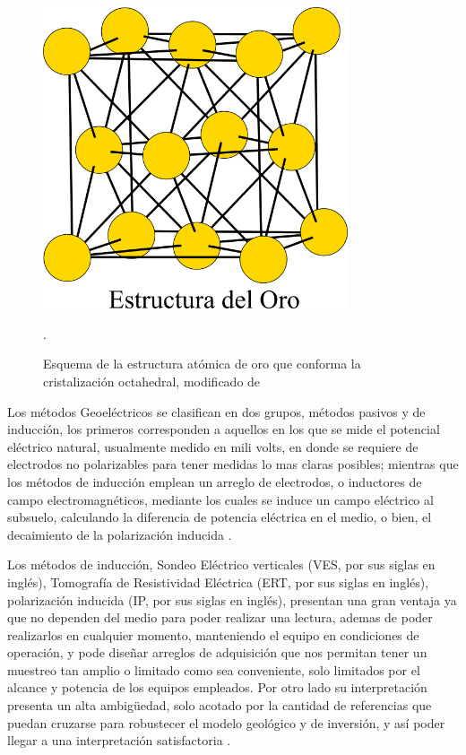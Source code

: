 			\begin{figure}[h!]
				\centering
				\includegraphics[width=9cm]{Imagenes/estructura-oro}
				\caption[Estructura atómica del oro]{Esquema de la estructura atómica de oro que conforma la cristalización octahedral, modificado de \citet{sorrell1973}}.
				\label{fig:eo}
			\end{figure}
			
			Los métodos Geoeléctricos se clasifican en dos grupos, métodos pasivos y de inducción, los primeros corresponden a aquellos en los que se mide el potencial eléctrico natural, usualmente medido en mili volts, en donde se requiere de electrodos no polarizables para tener medidas lo mas claras posibles; mientras que los métodos de inducción emplean un arreglo de electrodos, o inductores de campo electromagnéticos, mediante los cuales se induce un campo eléctrico al subsuelo, calculando la diferencia de potencia eléctrica en el medio, o bien, el decaimiento de la polarización inducida \citep{revil2013, reynolds2011, igboama2023}.
			
			Los métodos de inducción, Sondeo Eléctrico verticales (VES, por sus siglas en inglés), Tomografía de Resistividad Eléctrica (ERT, por sus siglas en inglés), polarización inducida (IP, por sus siglas en inglés), presentan una gran ventaja ya que no dependen del medio para poder realizar una lectura, ademas de poder realizarlos en cualquier momento, manteniendo el equipo en condiciones de operación, y pode diseñar arreglos de adquisición que nos permitan tener un muestreo tan amplio o limitado como sea conveniente, solo limitados por el alcance y potencia de los equipos empleados. Por otro lado su interpretación presenta un alta ambigüedad, solo acotado por la cantidad de referencias que puedan cruzarse para robustecer el modelo geológico y de inversión, y así poder llegar a una interpretación satisfactoria \citep{reynolds2011, igboama2023}.
			
